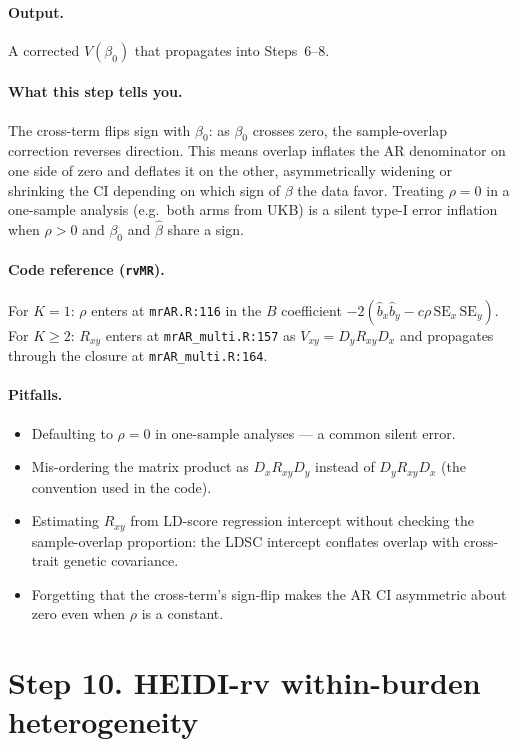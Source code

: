 \documentclass[11pt]{article}
\begin{document}
\paragraph{Output.} A corrected $V(\beta_0)$ that propagates into Steps~6--8.

\paragraph{What this step tells you.} The cross-term flips sign with $\beta_0$: as $\beta_0$ crosses zero, the sample-overlap correction reverses direction. This means overlap inflates the AR denominator on one side of zero and deflates it on the other, asymmetrically widening or shrinking the CI depending on which sign of $\beta$ the data favor. Treating $\rho=0$ in a one-sample analysis (e.g.\ both arms from UKB) is a silent type-I error inflation when $\rho>0$ and $\beta_0$ and $\hat\beta$ share a sign.

\paragraph{Code reference (\texttt{rvMR}).} For $K=1$: $\rho$ enters at \verb|mrAR.R:116| in the $B$ coefficient $-2(\hat b_x\hat b_y - c\rho\,\mathrm{SE}_x\,\mathrm{SE}_y)$. For $K\ge 2$: $R_{xy}$ enters at \verb|mrAR_multi.R:157| as $V_{xy} = D_y R_{xy} D_x$ and propagates through the closure at \verb|mrAR_multi.R:164|.

\paragraph{Pitfalls.}
\begin{itemize}
\item Defaulting to $\rho=0$ in one-sample analyses --- a common silent error.
\item Mis-ordering the matrix product as $D_x R_{xy} D_y$ instead of $D_y R_{xy} D_x$ (the convention used in the code).
\item Estimating $R_{xy}$ from LD-score regression intercept without checking the sample-overlap proportion: the LDSC intercept conflates overlap with cross-trait genetic covariance.
\item Forgetting that the cross-term's sign-flip makes the AR CI asymmetric about zero even when $\rho$ is a constant.
\end{itemize}

\section*{Step 10. HEIDI-rv within-burden heterogeneity}
\end{document}
